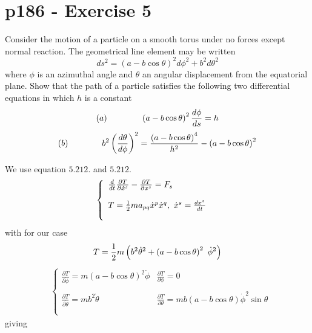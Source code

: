 \section{p186 - Exercise 5}
\begin{tcolorbox}
Consider the motion of a particle on a smooth torus under no forces except normal reaction. The geometrical line element may be written $$ ds^2=\left(a-b\cos \theta \right)^2 d{\phi}^2+b^2 d\theta^2$$ where $\phi$ is an azimuthal angle and $\theta$ an angular displacement from the equatorial plane. Show that  the path of a particle satisfies the following two differential equations in which $h$ is a constant 
$$(a)\quad\quad\quad\quad \left(a-b\cos\theta\right)^2\dv{\phi}{s} = h$$
$$(b)\quad\quad\quad\quad b^2\left(\dv{\theta}{\phi}\right)^2= \frac{\left(a-b\cos\theta\right)^4}{h^2}-\left(a-b\cos\theta\right)^2$$
\end{tcolorbox}
We use equation $\mathbf{5.212.}$ and  $\mathbf{5.212.}$
\begin{align}
&\left\{\begin{array}{l}
\dv{}{t}\frac{\partial T}{\partial \dot{x}^s} - \frac{\partial T}{\partial x^s} = F_{s}\\\\
T = \frac{1}{2} m a_{pq}\dot{x}^p\dot{x}^q, \ \dot{x}^s=\dv{x^s}{t}\\\\
\end{array}\right.
\end{align}
with for our case
\begin{align}
T = \half m \left(b^2\dot{\theta}^2+ \left(a-b\cos \theta \right)^2  \ \dot{\phi}^2 \right)
\end{align}
\begin{align}
&\left\{\begin{array}{ll}
\frac{\partial T}{\partial \dot{\phi}}= m \left(a-b\cos \theta \right)^2   \dot{\phi}&\frac{\partial T}{\partial {\phi}}= 0\\\\
\frac{\partial T}{\partial \dot{\theta}}=  mb^2\dot{\theta}&\frac{\partial T}{\partial {\theta}}=  mb\left(a-b\cos \theta \right)\dot{\phi}^2\sin \theta\\\\
\end{array}\right.
\end{align}giving
